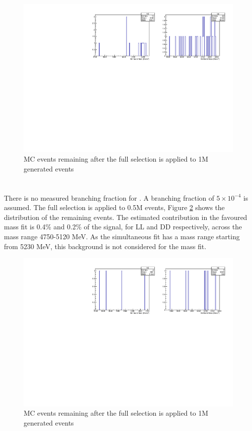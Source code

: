\begin{figure}[h]
\centering
\includegraphics[width=0.7\linewidth]{figures/backgrounds/B2DKKs.pdf}
\caption{\decay{\B}{\D\KS\kaon} MC events remaining after the full selection is applied to 1M generated events}
\label{B2DKKs}
\end{figure}

\section{\decay{\Bs}{\Dz\KS\pi\pi}}

There is no measured branching fraction for \decay{\Bs}{\Dz\KS\pi\pi}. A \decay{\Bs}{\Dz\KS\pi\pi} branching fraction of $5 \times 10^{-4}$ is assumed. The full selection is applied to 0.5M \decay{\Bs}{\Dz\KS\pi\pi} events, Figure \ref{Bs2D0KsPiPi} shows the distribution of the remaining events. The estimated contribution in the favoured \decay{\B}{\D(\kaon\pi)\Kstar} mass fit is 0.4\% and 0.2\% of the signal, for LL and DD respectively, across the mass range 4750-5120 MeV. As the simultaneous fit has a mass range starting from 5230 MeV, this background is not considered for the mass fit.

\begin{figure}[h]
\centering
\includegraphics[width=0.7\linewidth]{figures/backgrounds/Bs2D0KsPiPi.pdf}
\caption{\decay{\Bs}{\Dz\KS\pi\pi} MC events remaining after the full selection is applied to 1M generated events}
\label{Bs2D0KsPiPi}
\end{figure}

\clearpage